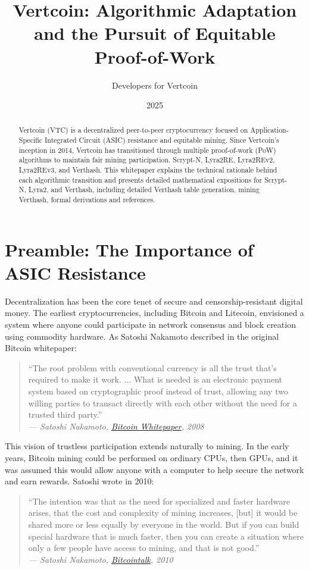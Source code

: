 \documentclass[12pt]{article}
\title{\textbf{Vertcoin: Algorithmic Adaptation and the Pursuit of Equitable Proof-of-Work}}
\author{Developers for Vertcoin}
\date{2025}
\begin{document}
\maketitle

\begin{abstract}
Vertcoin (VTC) is a decentralized peer-to-peer cryptocurrency focused on Application-Specific Integrated Circuit (ASIC) resistance and equitable mining. Since Vertcoin's inception in 2014, Vertcoin has transitioned through multiple proof-of-work (PoW) algorithms to maintain fair mining participation. Scrypt-N, Lyra2RE, Lyra2REv2, Lyra2REv3, and Verthash. This whitepaper explains the technical rationale behind each algorithmic transition and presents detailed mathematical expositions for Scrypt-N, Lyra2, and Verthash, including detailed Verthash table generation, mining Verthash, formal derivations and references.
\end{abstract}

\section*{Preamble: The Importance of ASIC Resistance}

Decentralization has been the core tenet of secure and censorship-resistant digital money. The earliest cryptocurrencies, including Bitcoin and Litecoin, envisioned a system where anyone could participate in network consensus and block creation using commodity hardware. As Satoshi Nakamoto described in the original Bitcoin whitepaper:

\begin{quote}
    ``The root problem with conventional currency is all the trust that’s required to make it work. $\ldots$ What is needed is an electronic payment system based on cryptographic proof instead of trust, allowing any two willing parties to transact directly with each other without the need for a trusted third party.'' \\
    \textit{--- Satoshi Nakamoto, \href{https://bitcoin.org/bitcoin.pdf}{Bitcoin Whitepaper}, 2008}
\end{quote}

This vision of trustless participation extends naturally to mining. In the early years, Bitcoin mining could be performed on ordinary CPUs, then GPUs, and it was assumed this would allow anyone with a computer to help secure the network and earn rewards. Satoshi wrote in 2010:
\begin{quote}
    ``The intention was that as the need for specialized and faster hardware arises, that the cost and complexity of mining increases, [but] it would be shared more or less equally by everyone in the world. But if you can build special hardware that is much faster, then you can create a situation where only a few people have access to mining, and that is not good.'' \\ \textit{--- Satoshi Nakamoto, \href{https://bitcointalk.org/index.php?topic=2228.msg29444\#msg29444}{Bitcointalk}, 2010}
\end{quote}
\end{document}
